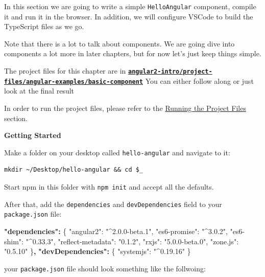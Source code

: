 \documentclass[12pt,]{article}
\newenvironment{Shaded}{}{}
\newcommand{\DataTypeTok}[1]{{#1}}
\newcommand{\StringTok}[1]{\textcolor[rgb]{0.00,0.50,0.50}{{#1}}}
\newcommand{\FunctionTok}[1]{{#1}}
\newcommand{\ErrorTok}[1]{\textcolor[rgb]{1.00,0.00,0.00}{\textbf{{#1}}}}
\begin{document}
In this section we are going to write a simple \texttt{HelloAngular}
component, compile it and run it in the browser. In addition, we will
configure VSCode to build the TypeScript files as we go.

Note that there is a lot to talk about components. We are going dive
into components a lot more in later chapters, but for now let's just
keep things simple.

The project files for this chapter are in
\textbf{\href{https://github.com/st32lth/angular2-intro/tree/master/project-files/angular-examples/basic-component}{\texttt{angular2-intro/project-files/angular-examples/basic-component}}}
You can either follow along or just look at the final result

In order to run the project files, please refer to the
\protect\hyperlink{running-the-project-files}{Running the Project Files}
section.

\textbf{Getting Started}

Make a folder on your desktop called \texttt{hello-angular} and navigate
to it:

\begin{verbatim}
mkdir ~/Desktop/hello-angular && cd $_
\end{verbatim}

Start npm in this folder with \texttt{npm\ init} and accept all the
defaults.

After that, add the \texttt{dependencies} and \texttt{devDependencies}
field to your \texttt{package.json} file:

\begin{Shaded}
\begin{Highlighting}[numbers=left,,]
\ErrorTok{"dependencies":} \FunctionTok{\{}
  \DataTypeTok{"angular2"}\FunctionTok{:} \StringTok{"^2.0.0-beta.1"}\FunctionTok{,}
  \DataTypeTok{"es6-promise"}\FunctionTok{:} \StringTok{"^3.0.2"}\FunctionTok{,}
  \DataTypeTok{"es6-shim"}\FunctionTok{:} \StringTok{"^0.33.3"}\FunctionTok{,}
  \DataTypeTok{"reflect-metadata"}\FunctionTok{:} \StringTok{"0.1.2"}\FunctionTok{,}
  \DataTypeTok{"rxjs"}\FunctionTok{:} \StringTok{"5.0.0-beta.0"}\FunctionTok{,}
  \DataTypeTok{"zone.js"}\FunctionTok{:} \StringTok{"0.5.10"}
\FunctionTok{\}}\ErrorTok{,}
\ErrorTok{"devDependencies":} \FunctionTok{\{}
  \DataTypeTok{"systemjs"}\FunctionTok{:} \StringTok{"^0.19.16"}
\FunctionTok{\}}
\end{Highlighting}
\end{Shaded}

your \texttt{package.json} file should look something like the
follwoing:
\end{document}
